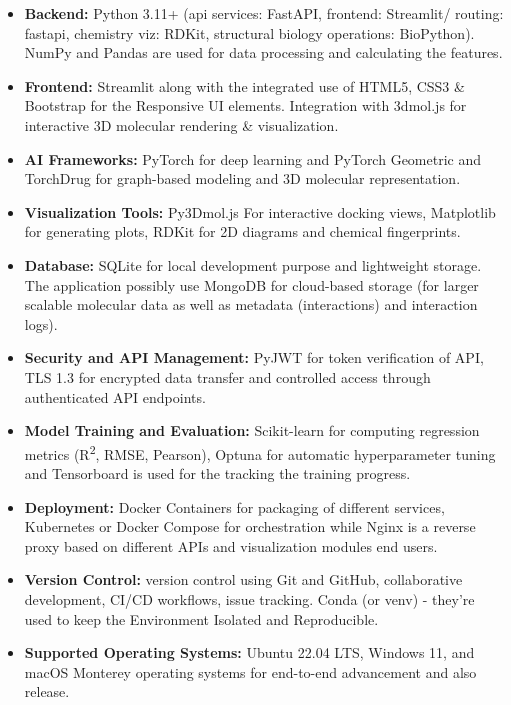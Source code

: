 \documentclass[12pt,a4]{report}
\begin{document}
\begin{itemize}
\item \textbf{Backend:} Python 3.11+ (api services: FastAPI, frontend: Streamlit/ routing: fastapi, chemistry viz: RDKit, structural biology operations: BioPython). NumPy and Pandas are used for data processing and calculating the features.

\item \textbf{Frontend:} Streamlit along with the integrated use of HTML5, CSS3 \& Bootstrap for the Responsive UI elements. Integration with 3dmol.js for interactive 3D molecular rendering \& visualization.

\item \textbf{AI Frameworks:} PyTorch for deep learning and PyTorch Geometric and TorchDrug for graph-based modeling and 3D molecular representation.

\item \textbf{Visualization Tools:} Py3Dmol.js For interactive docking views, Matplotlib for generating plots, RDKit for 2D diagrams and chemical fingerprints.

\item \textbf{Database:} SQLite for local development purpose and lightweight storage. The application possibly use MongoDB for cloud-based storage (for larger scalable molecular data as well as metadata (interactions) and interaction logs).

\item \textbf{Security and API Management:} PyJWT for token verification of API, TLS 1.3 for encrypted data transfer and controlled access through authenticated API endpoints.

\item \textbf{Model Training and Evaluation:} Scikit-learn for computing regression metrics (R\textsuperscript{2}, RMSE, Pearson), Optuna for automatic hyperparameter tuning and Tensorboard is used for the tracking the training progress.

\item \textbf{Deployment:} Docker Containers for packaging of different services, Kubernetes or Docker Compose for orchestration while Nginx is a reverse proxy based on different APIs and visualization modules end users.

\item \textbf{Version Control:} version control using Git and GitHub, collaborative development, CI/CD workflows, issue tracking. Conda (or venv) - they're used to keep the Environment Isolated and Reproducible.

\item \textbf{Supported Operating Systems:} Ubuntu 22.04 LTS, Windows 11, and macOS Monterey operating systems for end-to-end advancement and also release.
\end{itemize}
\end{document}
